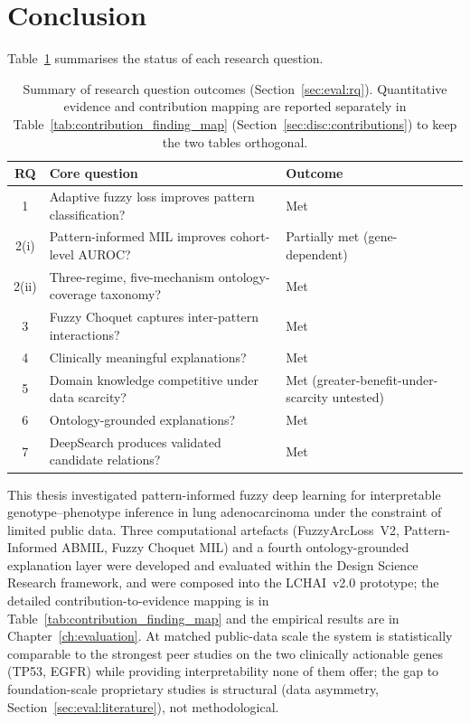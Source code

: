 \section{Conclusion}
\label{sec:disc:conclusion}

Table~\ref{tab:rq_summary_ch7} summarises the status of each research
question.

\begin{table}[ht!]
\centering
\small
\caption[Summary of research question outcomes]{Summary of
research question outcomes
(Section~\ref{sec:eval:rq}).
Quantitative evidence and contribution mapping are reported
separately in Table~\ref{tab:contribution_finding_map}
(Section~\ref{sec:disc:contributions})
to keep the two tables orthogonal.}
\label{tab:rq_summary_ch7}
\renewcommand{\arraystretch}{1.15}
\begin{tabularx}{\textwidth}{@{}c X X@{}}
\hline
\textbf{RQ} & \textbf{Core question} & \textbf{Outcome} \\
\hline
1     & Adaptive fuzzy loss improves pattern classification?       & Met \\
2(i)  & Pattern-informed MIL improves cohort-level AUROC?          & Partially met (gene-dependent) \\
2(ii) & Three-regime, five-mechanism ontology-coverage taxonomy?   & Met \\
3     & Fuzzy Choquet captures inter-pattern interactions?         & Met \\
4     & Clinically meaningful explanations?                        & Met \\
5     & Domain knowledge competitive under data scarcity?          & Met (greater-benefit-under-scarcity untested) \\
6     & Ontology-grounded explanations?                            & Met \\
7     & DeepSearch produces validated candidate relations?         & Met \\
\hline
\end{tabularx}
\end{table}

This thesis investigated pattern-informed fuzzy deep learning for
interpretable genotype--phenotype inference in lung adenocarcinoma
under the constraint of limited public data.
Three computational artefacts (FuzzyArcLoss~V2, Pattern-Informed
ABMIL, Fuzzy Choquet MIL) and a fourth ontology-grounded
explanation layer were developed and evaluated within the Design
Science Research framework, and were composed into the LCHAI~v2.0
prototype; the detailed contribution-to-evidence mapping is in
Table~\ref{tab:contribution_finding_map} and the empirical results
are in Chapter~\ref{ch:evaluation}.
At matched public-data scale the system is statistically
comparable to the strongest peer studies on the two clinically
actionable genes (TP53, EGFR) while providing interpretability
none of them offer; the gap to foundation-scale proprietary
studies is structural (data asymmetry,
Section~\ref{sec:eval:literature}), not methodological.

